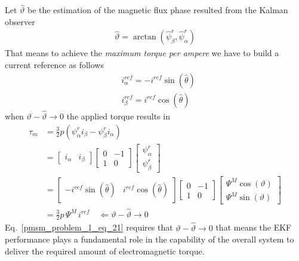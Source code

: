 \documentclass[11pt,a4paper,oneside]{book}
\numberwithin{equation}{section}
\theoremstyle{it}
\theoremstyle{definition}
\begin{document}
Let $\hat{\vartheta}$ be the estimation of the magnetic flux phase resulted 
from the Kalman observer 
\begin{equation}\label{pmsm_problem_1_eq_19}
	\begin{aligned}
		\hat{\vartheta} = 
		\arctan\left(\hat{\psi}^r_{\beta},\hat{\psi}^r_{\alpha} \right)  
	\end{aligned} 
\end{equation}
That means to achieve the \textit{maximum torque per ampere} we have to build a 
current reference as follows 
\begin{equation}\label{pmsm_problem_1_eq_20}
	\begin{aligned}
		&i_{\alpha}^{ref} = -i^{ref}\sin(\hat{\theta})  \\[6pt]
		&i_{\beta}^{ref} = i^{ref}\cos(\hat{\theta})
	\end{aligned} 
\end{equation}
when $\vartheta - \hat{\vartheta} \rightarrow 0$ the applied torque results in
\begin{equation}\label{pmsm_problem_1_eq_21}
	\begin{aligned}
		\tau_m &= \frac{3}{2}p\left( 
		\psi^r_{\alpha}i_{\beta}-\psi^r_{\beta}i_{\alpha}\right) \\[6pt]
		&= \begin{bmatrix}
			i_{\alpha} & i_{\beta}
		\end{bmatrix} \begin{bmatrix}
			0 & -1 \\[6pt] 1 & 0
		\end{bmatrix}\begin{bmatrix}
			\psi^r_{\alpha} \\[6pt] \psi^r_{\beta}
		\end{bmatrix}\\[6pt]
		&= \begin{bmatrix}
			-i^{ref}\sin(\hat{\theta}) & i^{ref}\cos(\hat{\theta})
		\end{bmatrix} \begin{bmatrix}
			0 & -1 \\[6pt] 1 & 0
		\end{bmatrix}\begin{bmatrix}
			\Psi^M\cos(\vartheta) \\[6pt] \Psi^M\sin(\vartheta)
		\end{bmatrix}\\[6pt]
		&= \frac{3}{2}p\,\Psi^M\,i^{ref} \quad\Leftarrow\vartheta - \hat{\vartheta} \rightarrow 0
	\end{aligned}
\end{equation}
Eq.~\eqref{pmsm_problem_1_eq_21} requires that $\vartheta - \hat{\vartheta} \rightarrow 0$ that means the EKF performance plays a fundamental role in the capability of the overall system to deliver the required amount of electromagnetic torque. 
\end{document}
